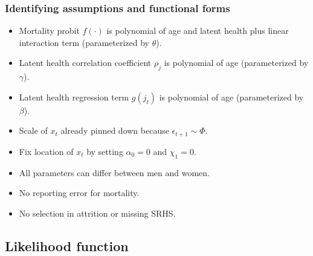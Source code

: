 \documentclass[aspectratio=169]{beamer}
\begin{document}
\begin{frame}\frametitle{Identifying assumptions and functional forms}
\begin{itemize}
	\item <1->Mortality probit $f(\cdot)$ is polynomial of age and latent health plus linear interaction term (parameterized by $\theta$).
	
	\item <2->Latent health correlation coefficient $\rho_j$ is polynomial of age (parameterized by $\gamma$).
	
	\item <3->Latent health regression term $g(j_t)$ is polynomial of age (parameterized by $\beta$).
	
	\item <4->Scale of $x_t$ already pinned down because $\epsilon_{t+1} \sim \Phi$.
	
	\item <4->Fix location of $x_t$ by setting $\alpha_0 = 0$ and $\chi_1 = 0$.
	
	\item <5->All parameters can differ between men and women.
	
	\item <5->No reporting error for mortality.
	
	\item <5->No selection in attrition or missing SRHS.
\end{itemize}
\end{frame}



\subsection{Likelihood function}
\end{document}
